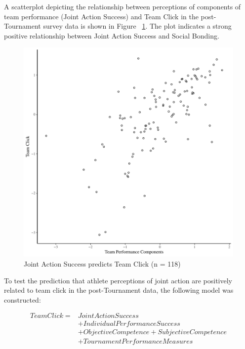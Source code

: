 A scatterplot depicting the relationship between perceptions of components of team performance (Joint Action Success) and Team Click in the post-Tournament survey data is shown in Figure ~\ref{fig:jasClickBasicXY}. The plot indicates a strong positive relationship between Joint Action Success and Social Bonding.

\begin{figure}[htbp]
  \centering
\includegraphics[scale=.5]{images/jasClickBasicXY.pdf}
  \caption{Joint Action Success predicts Team Click (n = 118)}
  \label{fig:jasClickBasicXY}
\end{figure}


To test the prediction that athlete perceptions of joint action are positively
related to team click in the post-Tournament data, the following model was constructed:


  \begin{align*}
    Team Click =  & Joint Action Success\\
              & + Individual Performance Success \\
              & + Objective Competence + Subjective Competence\\
              & + TournamentPerformanceMeasures \\
  \end{align*}

